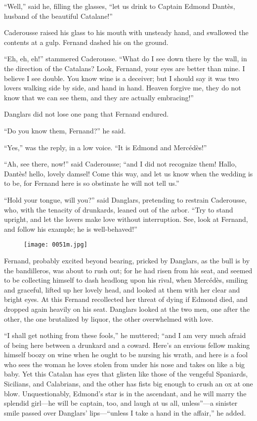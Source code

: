 “Well,” said he, filling the glasses, “let us drink to Captain Edmond
Dantès, husband of the beautiful Catalane!”

Caderousse raised his glass to his mouth with unsteady hand, and
swallowed the contents at a gulp. Fernand dashed his on the ground.

“Eh, eh, eh!” stammered Caderousse. “What do I see down there by the
wall, in the direction of the Catalans? Look, Fernand, your eyes are
better than mine. I believe I see double. You know wine is a deceiver;
but I should say it was two lovers walking side by side, and hand in
hand. Heaven forgive me, they do not know that we can see them, and
they are actually embracing!”

Danglars did not lose one pang that Fernand endured.

“Do you know them, Fernand?” he said.

“Yes,” was the reply, in a low voice. “It is Edmond and Mercédès!”

“Ah, see there, now!” said Caderousse; “and I did not recognize them!
Hallo, Dantès! hello, lovely damsel! Come this way, and let us know
when the wedding is to be, for Fernand here is so obstinate he will not
tell us.”

“Hold your tongue, will you?” said Danglars, pretending to restrain
Caderousse, who, with the tenacity of drunkards, leaned out of the
arbor. “Try to stand upright, and let the lovers make love without
interruption. See, look at Fernand, and follow his example; he is
well-behaved!”

\begin{figure}[h]
\texttt{[image: 0051m.jpg]}
\end{figure}

Fernand, probably excited beyond bearing, pricked by Danglars, as the
bull is by the bandilleros, was about to rush out; for he had risen
from his seat, and seemed to be collecting himself to dash headlong
upon his rival, when Mercédès, smiling and graceful, lifted up her
lovely head, and looked at them with her clear and bright eyes. At this
Fernand recollected her threat of dying if Edmond died, and dropped
again heavily on his seat. Danglars looked at the two men, one after
the other, the one brutalized by liquor, the other overwhelmed with
love.

“I shall get nothing from these fools,” he muttered; “and I am very
much afraid of being here between a drunkard and a coward. Here’s an
envious fellow making himself boozy on wine when he ought to be nursing
his wrath, and here is a fool who sees the woman he loves stolen from
under his nose and takes on like a big baby. Yet this Catalan has eyes
that glisten like those of the vengeful Spaniards, Sicilians, and
Calabrians, and the other has fists big enough to crush an ox at one
blow. Unquestionably, Edmond’s star is in the ascendant, and he will
marry the splendid girl—he will be captain, too, and laugh at us all,
unless”—a sinister smile passed over Danglars’ lips—“unless I take a
hand in the affair,” he added.

